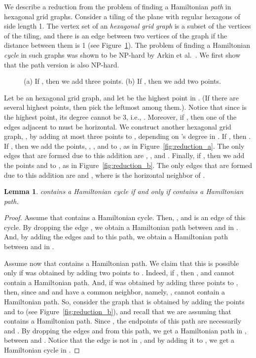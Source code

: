 \documentclass[11pt]{article}
\newtheorem{lemma}[theorem]{Lemma}
\begin{document}
{We describe a reduction from the problem of finding a Hamiltonian {\em path} in hexagonal grid graphs. 
Consider a tiling of the plane with regular hexagons of side length 1. The vertex set of an {\em hexagonal grid graph} is a subset of the vertices of the tiling, and there is an edge between two vertices of the graph if the distance between them is 1 (see Figure~\ref{fig:reduction120}). 
The problem of finding a Hamiltonian {\em cycle} in such graphs was shown to be NP-hard by Arkin et al.~\cite{AFIMMRPRX09}.
We first show that the path version is also NP-hard.

\begin{figure}[htb]
\centering
	\hspace{.75cm}
 	\caption{(a) If , then we add three points. (b) If , then we add two points.} \label{fig:reduction120}	
\end{figure} 
 
Let  be an hexagonal grid graph, and let  be the highest point in . (If there are several highest points, then pick the leftmost among them.). Notice that since  is the highest point, its degree cannot be 3, i.e., . 
Moreover, if , then one of the edges adjacent to  must be horizontal.
We construct another hexagonal grid graph, , by adding at most three points to , depending on 's degree in .
If , then .
If , then we add the points, , , and  to , as in Figure~\ref{fig:reduction_a}. The only edges that are formed due to this addition are , , and .
Finally, if , then  we add the points  and  to , as in Figure~\ref{fig:reduction_b}. The only edges that are formed due to this addition are  and , where  is the horizontal neighbor of .

\begin{lemma}
 contains a Hamiltonian cycle if and only if  contains a Hamiltonian path.
\end{lemma}
\begin{proof}
Assume that  contains a Hamiltonian cycle. Then, , and  is an edge of this cycle. By dropping the edge , we obtain a Hamiltonian path between  and  in . And, by adding the edges  and  to this path, we obtain a Hamiltonian path between  and  in . 

Assume now that  contains a Hamiltonian path. We claim that this is possible only if  was obtained by adding two points to . Indeed, if , then , and  cannot contain a Hamiltonian path. And, if  was obtained by adding three points to , then, since  and  and  have a common neighbor, namely, ,  cannot contain a Hamiltonian path. 
So, consider the graph  that is obtained by adding the points  and  to  (see Figure~\ref{fig:reduction_b}), and recall that we are assuming that  contains a Hamiltonian path. Since , the endpoints of this path are necessarily  and . By dropping the edges  and  from this path, we get a Hamiltonian path  in , between  and . Notice that the edge  is not in , and by adding it to , we get a Hamiltonian cycle in . 
\end{proof}

}
\end{document}
